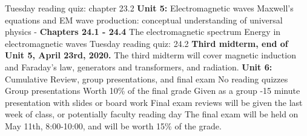 \documentclass[10pt]{article}
\begin{document}
\begin{outline}[enumerate]
\3 Tuesday reading quiz: chapter 23.2
\1 \textbf{Unit 5:} Electromagnetic waves
\2 Maxwell's equations and EM wave production: conceptual understanding of universal physics - \textbf{Chapters 24.1 - 24.4}
\3 The electromagnetic spectrum
\3 Energy in electromagnetic waves
\3 Tuesday reading quiz: 24.2
\1 \textbf{Third midterm, end of Unit 5, April 23rd, 2020.} The third midterm will cover magnetic induction and Faraday's law, generators and transformers, and radiation.
\1 \textbf{Unit 6:} Cumulative Review, group presentations, and final exam
\2 No reading quizzes
\2 Group presentations
\3 Worth 10\% of the final grade
\3 Given as a group
-15 minute presentation with slides or board work
\3 Final exam reviews will be given the last week of class, or potentially faculty reading day
\3 The final exam will be held on May 11th, 8:00-10:00, and will be worth 15\% of the grade.
\end{outline}
\end{document}
